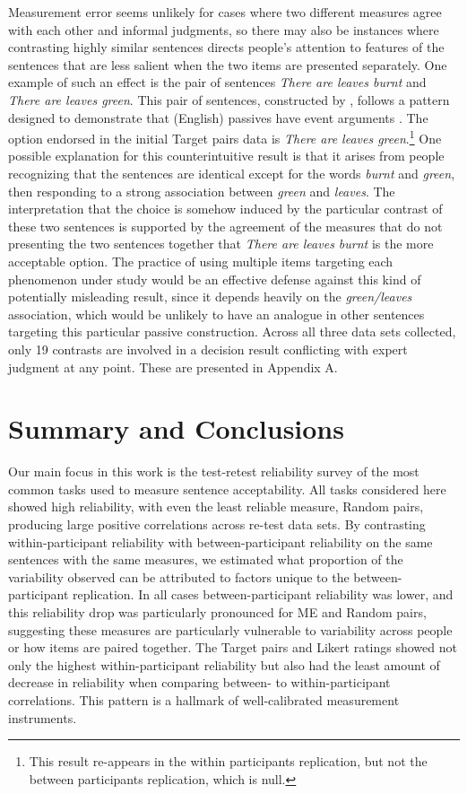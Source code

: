\documentclass[doc]{apa6}
\newcommand{\targchoice}{{\sc Target pairs}}
\newcommand{\rndchoice}{{\sc Random pairs}}
\newcommand{\ME}{{\sc ME}}%
\newcommand{\likert}{{\sc Likert}}
\newcommand{\initial}{{\sc initial}}
\newcommand{\withinppnt}{{\sc within participants}}
\newcommand{\betweenppnt}{{\sc between participants}}
\begin{document}
Measurement error seems unlikely for cases where two different measures agree with each other and informal judgments, so there may also be instances where contrasting highly similar sentences directs people's attention to features of the sentences that are less salient when the two items are presented separately. One example of such an effect is the pair of sentences {\it There are leaves burnt} and {\it There are leaves green}. This pair of sentences, constructed by \citet{sprouse2013formalinformal},
follows a pattern designed to demonstrate that (English) passives have event arguments \citep{basilico2003smallclauses}. The option endorsed in the \initial{} \targchoice{} data is {\it There are leaves green}.\footnote{This result re-appears in the \withinppnt{} replication, but not the \betweenppnt{} replication, which is null.}  One possible explanation for this counterintuitive result is that it arises from people recognizing that the sentences are identical except for the words {\it burnt} and {\it green}, then responding to a strong association between {\it green} and {\it leaves}. The interpretation that the choice is somehow induced by the particular contrast of these two sentences is supported by the agreement of the measures that do not presenting the two sentences together that {\it There are leaves burnt} is the more acceptable option. The practice of using multiple items targeting each phenomenon under study would be an effective defense against this kind of potentially misleading result, since it depends heavily on the {\it green/leaves} association, which would be unlikely to have an analogue in other sentences targeting this particular passive construction. Across all three data sets collected, only 19 contrasts are involved in a decision result conflicting with expert judgment at any point. These are presented in Appendix A.


\section{Summary and Conclusions}

Our main focus in this work is the test-retest reliability survey of the most common tasks used to measure sentence acceptability.
All tasks considered here showed high reliability, with even the least reliable measure, \rndchoice, producing large positive correlations across re-test data sets. By contrasting within-participant reliability with between-participant reliability on the same sentences with the same measures, we estimated what proportion of the variability observed can be attributed to factors unique to the between-participant replication. In all cases between-participant reliability was lower, and this reliability drop was particularly pronounced for \ME{} and \rndchoice, suggesting these measures are particularly vulnerable to variability across people or how items are paired together. The \targchoice{} and \likert{} ratings showed not only the highest within-participant reliability but also had the least amount of decrease in reliability when comparing between- to within-participant correlations. This pattern is a hallmark of well-calibrated measurement instruments.
\end{document}
